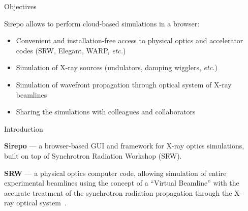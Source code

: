 \documentclass[final]{beamer}
\newlength{\sepwid}
\newlength{\onecolwid}
\begin{document}
\begin{frame}[t] %

\begin{columns}[t] %

\begin{column}{\sepwid}\end{column} %

\begin{column}{\onecolwid} %


\begin{alertblock}{Objectives}

Sirepo allows to perform cloud-based simulations in a browser:
\begin{itemize}
  \item Convenient and installation-free access to physical optics and accelerator codes (SRW, Elegant, WARP, \textit{etc.})
  \item Simulation of X-ray sources (undulators, damping wigglers, \textit{etc.})
  \item Simulation of wavefront propagation through optical system of X-ray beamlines
  \item Sharing the simulations with colleagues and collaborators
\end{itemize}

\end{alertblock}



\begin{block}{\faInfoCircle{} Introduction}

\textbf{Sirepo} --- a browser-based GUI and framework for X-ray optics simulations, built on top of Synchrotron Radiation Workshop (SRW).

\vspace{1cm}

\textbf{SRW} --- a physical optics computer code, allowing simulation of entire experimental beamlines using the concept of a ``Virtual Beamline'' with the accurate treatment of the synchrotron radiation propagation through the X-ray optical system~\cite{Chubar1998_SRW, Chubar2002_SRW, Chubar2013_SRW}.
\end{block}


\end{column}
\end{columns}
\end{frame}
\end{document}
